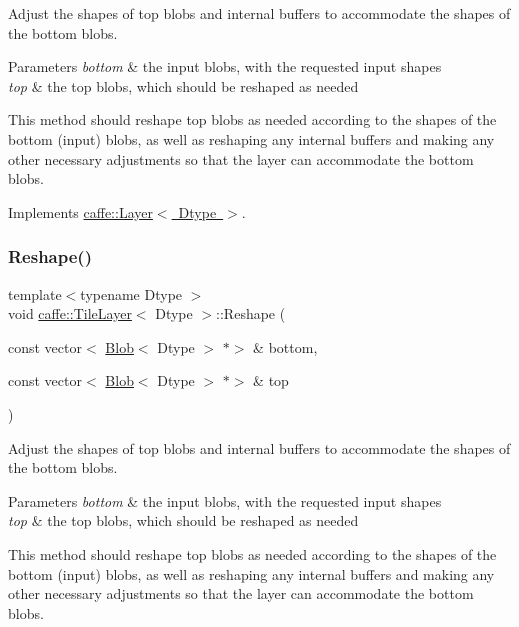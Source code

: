 Adjust the shapes of top blobs and internal buffers to accommodate the shapes of the bottom blobs. 


\begin{DoxyParams}{Parameters}
{\em bottom} & the input blobs, with the requested input shapes \\
\hline
{\em top} & the top blobs, which should be reshaped as needed\\
\hline
\end{DoxyParams}
This method should reshape top blobs as needed according to the shapes of the bottom (input) blobs, as well as reshaping any internal buffers and making any other necessary adjustments so that the layer can accommodate the bottom blobs. 

Implements \mbox{\hyperlink{classcaffe_1_1_layer_a7fe981e8af8d93d587acf2a952be563d}{caffe\+::\+Layer$<$ Dtype $>$}}.

\mbox{\label{classcaffe_1_1_tile_layer_a593f5b8342f1b092633d2a1f7e4a6843}} 
\subsubsection{\texorpdfstring{Reshape()}{Reshape()}\hspace{0.1cm}{\footnotesize\ttfamily [2/2]}}
{\footnotesize\ttfamily template$<$typename Dtype $>$ \\
void \mbox{\hyperlink{classcaffe_1_1_tile_layer}{caffe\+::\+Tile\+Layer}}$<$ Dtype $>$\+::Reshape (\begin{DoxyParamCaption}\item[{const vector$<$ \mbox{\hyperlink{classcaffe_1_1_blob}{Blob}}$<$ Dtype $>$ $\ast$$>$ \&}]{bottom,  }\item[{const vector$<$ \mbox{\hyperlink{classcaffe_1_1_blob}{Blob}}$<$ Dtype $>$ $\ast$$>$ \&}]{top }\end{DoxyParamCaption})\hspace{0.3cm}{\ttfamily [virtual]}}



Adjust the shapes of top blobs and internal buffers to accommodate the shapes of the bottom blobs. 


\begin{DoxyParams}{Parameters}
{\em bottom} & the input blobs, with the requested input shapes \\
\hline
{\em top} & the top blobs, which should be reshaped as needed\\
\hline
\end{DoxyParams}
This method should reshape top blobs as needed according to the shapes of the bottom (input) blobs, as well as reshaping any internal buffers and making any other necessary adjustments so that the layer can accommodate the bottom blobs. 

